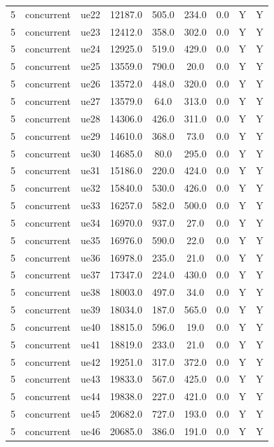 \begin{table}[ht]
\begin{tabular}{|c|c|c|c|c|c|c|c|c|}
5 & concurrent & ue22 & 12187.0 & 505.0 & 234.0 & 0.0 & Y & Y \\
5 & concurrent & ue23 & 12412.0 & 358.0 & 302.0 & 0.0 & Y & Y \\
5 & concurrent & ue24 & 12925.0 & 519.0 & 429.0 & 0.0 & Y & Y \\
5 & concurrent & ue25 & 13559.0 & 790.0 & 20.0 & 0.0 & Y & Y \\
5 & concurrent & ue26 & 13572.0 & 448.0 & 320.0 & 0.0 & Y & Y \\
5 & concurrent & ue27 & 13579.0 & 64.0 & 313.0 & 0.0 & Y & Y \\
5 & concurrent & ue28 & 14306.0 & 426.0 & 311.0 & 0.0 & Y & Y \\
5 & concurrent & ue29 & 14610.0 & 368.0 & 73.0 & 0.0 & Y & Y \\
5 & concurrent & ue30 & 14685.0 & 80.0 & 295.0 & 0.0 & Y & Y \\
5 & concurrent & ue31 & 15186.0 & 220.0 & 424.0 & 0.0 & Y & Y \\
5 & concurrent & ue32 & 15840.0 & 530.0 & 426.0 & 0.0 & Y & Y \\
5 & concurrent & ue33 & 16257.0 & 582.0 & 500.0 & 0.0 & Y & Y \\
5 & concurrent & ue34 & 16970.0 & 937.0 & 27.0 & 0.0 & Y & Y \\
5 & concurrent & ue35 & 16976.0 & 590.0 & 22.0 & 0.0 & Y & Y \\
5 & concurrent & ue36 & 16978.0 & 235.0 & 21.0 & 0.0 & Y & Y \\
5 & concurrent & ue37 & 17347.0 & 224.0 & 430.0 & 0.0 & Y & Y \\
5 & concurrent & ue38 & 18003.0 & 497.0 & 34.0 & 0.0 & Y & Y \\
5 & concurrent & ue39 & 18034.0 & 187.0 & 565.0 & 0.0 & Y & Y \\
5 & concurrent & ue40 & 18815.0 & 596.0 & 19.0 & 0.0 & Y & Y \\
5 & concurrent & ue41 & 18819.0 & 233.0 & 21.0 & 0.0 & Y & Y \\
5 & concurrent & ue42 & 19251.0 & 317.0 & 372.0 & 0.0 & Y & Y \\
5 & concurrent & ue43 & 19833.0 & 567.0 & 425.0 & 0.0 & Y & Y \\
5 & concurrent & ue44 & 19838.0 & 227.0 & 421.0 & 0.0 & Y & Y \\
5 & concurrent & ue45 & 20682.0 & 727.0 & 193.0 & 0.0 & Y & Y \\
5 & concurrent & ue46 & 20685.0 & 386.0 & 191.0 & 0.0 & Y & Y \\

\end{tabular}
\end{table}
